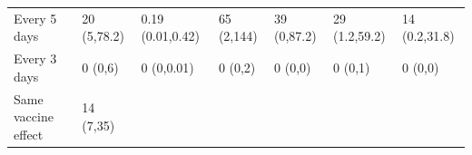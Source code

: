 \documentclass[
]{article}
\begin{document}
\begin{longtable}[]{@{}lllllll@{}}
\begin{minipage}[t]{0.18\columnwidth}\raggedright
Every 5 days\strut
\end{minipage} & \begin{minipage}[t]{0.12\columnwidth}\raggedright
20 (5,78.2)\strut
\end{minipage} & \begin{minipage}[t]{0.10\columnwidth}\raggedright
0.19 (0.01,0.42)\strut
\end{minipage} & \begin{minipage}[t]{0.11\columnwidth}\raggedright
65 (2,144)\strut
\end{minipage} & \begin{minipage}[t]{0.11\columnwidth}\raggedright
39 (0,87.2)\strut
\end{minipage} & \begin{minipage}[t]{0.09\columnwidth}\raggedright
29 (1.2,59.2)\strut
\end{minipage} & \begin{minipage}[t]{0.10\columnwidth}\raggedright
14 (0.2,31.8)\strut
\end{minipage}\tabularnewline
\begin{minipage}[t]{0.18\columnwidth}\raggedright
Every 3 days\strut
\end{minipage} & \begin{minipage}[t]{0.12\columnwidth}\raggedright
0 (0,6)\strut
\end{minipage} & \begin{minipage}[t]{0.10\columnwidth}\raggedright
0 (0,0.01)\strut
\end{minipage} & \begin{minipage}[t]{0.11\columnwidth}\raggedright
0 (0,2)\strut
\end{minipage} & \begin{minipage}[t]{0.11\columnwidth}\raggedright
0 (0,0)\strut
\end{minipage} & \begin{minipage}[t]{0.09\columnwidth}\raggedright
0 (0,1)\strut
\end{minipage} & \begin{minipage}[t]{0.10\columnwidth}\raggedright
0 (0,0)\strut
\end{minipage}\tabularnewline
\begin{minipage}[t]{0.18\columnwidth}\raggedright
Same vaccine effect\strut
\end{minipage} & \begin{minipage}[t]{0.12\columnwidth}\raggedright
14 (7,35)\strut

\end{minipage}
\end{longtable}
\end{document}
